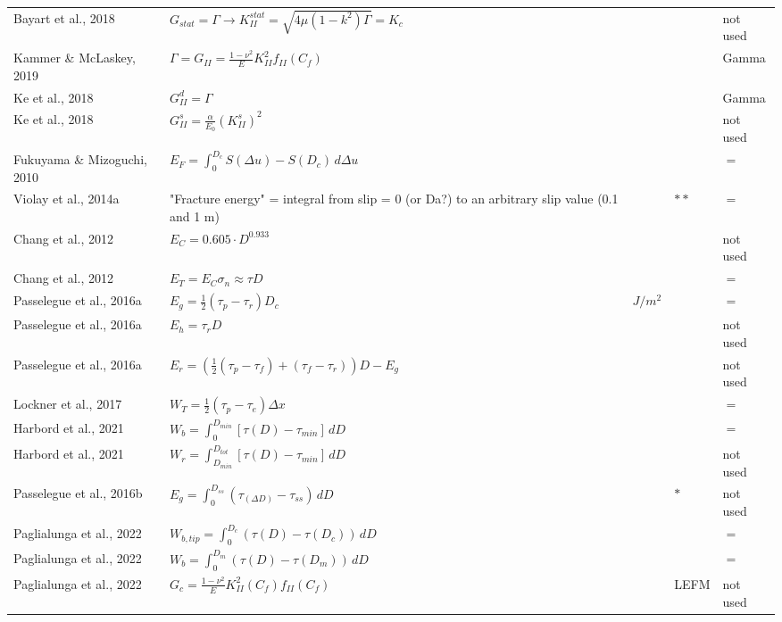 \documentclass{article}
\begin{document}
\begin{longtable}{|p{4 cm}|p{8 cm}|p{1.25 cm}|p{1.25 cm}|p{1.5 cm}|}
Bayart et al., 2018 & \( \displaystyle G_{stat} = \Gamma \rightarrow K_{II}^{stat} = \sqrt{4 \mu (1-k^2) \Gamma} = K_c \) & & & not used \\
Kammer \& McLaskey, 2019 & \( \displaystyle \Gamma = G_{II} = \frac{1-\nu^2}{E} K_{II}^2 f_{II}(C_f)\) & & & Gamma \\
Ke et al., 2018 & \( \displaystyle G_{II}^d = \Gamma \) & & & Gamma \\
Ke et al., 2018 & \( \displaystyle G_{II}^s = \frac{\alpha}{E_0} (K_{II}^s)^2 \) & & & not used \\
Fukuyama \& Mizoguchi, 2010 & \( \displaystyle E_F = \int_{0}^{D_c} S(\Delta u) - S(D_c) \,d \Delta u \) & & & $=$ \\
Violay et al., 2014a & "Fracture energy" = integral from slip = 0 (or Da?) to an arbitrary slip value (0.1 and 1 m) & & $**$ & $=$ \\
Chang et al., 2012 & \( \displaystyle E_C = 0.605 \cdot D^{0.933} \) & & & not used \\
Chang et al., 2012 & \( \displaystyle E_T = E_C \sigma_n \approx \tau D\) & & & $=$ \\
Passelegue et al., 2016a & \( \displaystyle E_g = \frac{1}{2} (\tau_p - \tau_r) D_c \) & $J/m^2$ & & $=$ \\
Passelegue et al., 2016a & \( \displaystyle E_h = \tau_r D \) & & & not used \\
Passelegue et al., 2016a & \( \displaystyle E_r = \left ( \frac{1}{2} (\tau_p - \tau_f) + (\tau_f - \tau_r) \right ) D - E_g  \) & & & not used \\
Lockner et al., 2017 & \( \displaystyle W_T = \frac{1}{2} (\tau_p - \tau_e) \Delta x \) & & & $=$ \\
Harbord et al., 2021 & \( \displaystyle W_b = \int_{0}^{D_{min}} [\tau(D) - \tau_{min}] \,d D \) & & & $=$ \\
Harbord et al., 2021 & \( \displaystyle W_r = \int_{D_{min}}^{D_{tot}} [\tau(D) - \tau_{min}] \,d D \) & & & not used \\
Passelegue et al., 2016b & \( \displaystyle E_g = \int_{0}^{D_{ss}} (\tau_{(\Delta D)} - \tau_{ss}) \,d D \) & & $*$ & not used \\
Paglialunga et al., 2022 & \( \displaystyle W_{b,tip} = \int_{0}^{D_c} (\tau(D)-\tau(D_c)) \,d D \) & & & $=$ \\
Paglialunga et al., 2022 & \( \displaystyle W_b = \int_{0}^{D_m} (\tau(D)-\tau(D_m)) \,d D \) & & & $=$ \\
Paglialunga et al., 2022 & \( \displaystyle G_c = \frac{1-\nu^2}{E} K_{II}^2 (C_f) f_{II} (C_f)\) & & LEFM & not used \\

\end{longtable}
\end{document}
